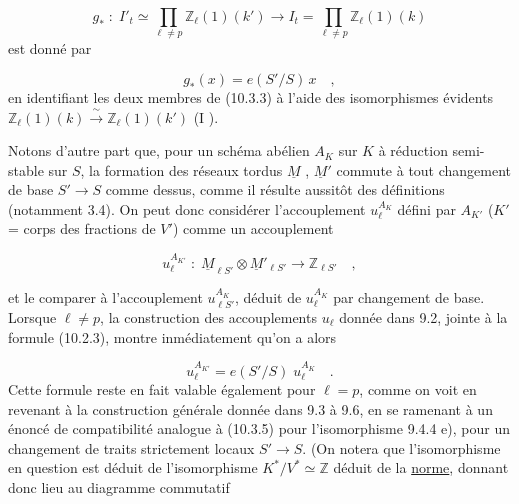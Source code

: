 \begin{equation}\tag{10.3.3}
g_* \; : \; I'_t \simeq \prod_{\ell \neq p} \mathbb{Z}_\ell(1)(k') \longrightarrow I_t = \prod_{\ell \neq p} \mathbb{Z}_\ell(1)(k)
\end{equation}
est donné par

\begin{equation}\tag{10.3.4}
g_*(x) = e(S'/S)\, x \quad ,
\end{equation}
en identifiant les deux membres de (10.3.3) à l'aide des isomorphismes évidents $\mathbb{Z}_\ell(1)(k) \xrightarrow{\ \sim\ } \mathbb{Z}_\ell(1)(k')$ (I \qquad ).

Notons d'autre part que, pour un schéma abélien $A_K$ sur $K$ à réduction semi-stable sur $S$, la formation des réseaux tordus $\underline{M}$ , $\underline{M}'$ commute à tout changement de base $S' \longrightarrow S$ comme dessus, comme il résulte aussitôt des définitions (notamment 3.4). On peut donc considérer l'accouplement $u_\ell^{A_K}$ défini par $A_{K'}$ ($K'$ = corps des fractions de $V'$) comme un accouplement

\begin{equation*}
u_\ell^{A_{K'}} \; : \; \underline{M}_{\ell S'} \otimes \underline{M}'_{\ell S'} \longrightarrow \mathbb{Z}_{\ell S'} \quad ,
\end{equation*}


et le comparer à l'accouplement $u_{\ell S'}^{A_K}$, déduit de $u_\ell^{A_K}$ par changement de base. Lorsque $\ell \neq p$, la construction des accouplements $u_\ell$ donnée dans 9.2, jointe à la formule (10.2.3), montre inmédiatement qu'on a alors

\begin{equation}\tag{10.3.5}
u_\ell^{A_{K'}} = e(S'/S) \; u_\ell^{A_K} \quad .
\end{equation}
Cette formule reste en fait valable également pour $\ell = p$, comme on voit en revenant à la construction générale donnée dans 9.3 à 9.6, en se ramenant à un énoncé de compatibilité analogue à (10.3.5) pour l'isomorphisme 9.4.4 e), pour un changement de traits strictement locaux $S' \longrightarrow S$. (On notera que l'isomorphisme en question est déduit de l'isomorphisme $K^*/V^* \simeq \mathbb{Z}$ déduit de la \underline{norme}, donnant donc lieu au diagramme commutatif

